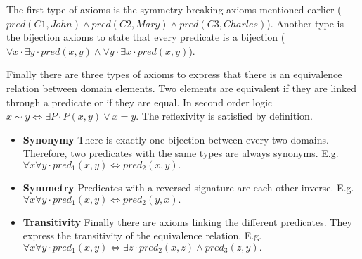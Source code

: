 The first type of axioms is the symmetry-breaking axioms mentioned earlier ($pred(C1, John) \land pred(C2, Mary) \land pred(C3, Charles)$). Another type is the bijection axioms to state that every predicate is a bijection ($\forall x \cdot \exists y \cdot pred(x, y) \land \forall y \cdot \exists x \cdot pred(x, y)$).

Finally there are three types of axioms to express that there is an equivalence relation between domain elements. Two elements are equivalent if they are linked through a predicate or if they are equal. In second order logic $x \sim y \Leftrightarrow \exists P \cdot P(x, y) \lor x = y$. The reflexivity is satisfied by definition.

\begin{itemize}
  \item \textbf{Synonymy} There is exactly one bijection between every two domains. Therefore, two predicates with the same types are always synonyms. E.g. $\forall x \forall y \cdot pred_1(x, y) \Leftrightarrow pred_2(x, y).$
  \item \textbf{Symmetry} Predicates with a reversed signature are each other inverse. E.g. $\forall x \forall y \cdot pred_1(x, y) \Leftrightarrow pred_2(y, x).$
  \item \textbf{Transitivity} Finally there are axioms linking the different predicates. They express the transitivity of the equivalence relation. E.g. $\forall x \forall y \cdot pred_1(x, y) \Leftrightarrow \exists z \cdot pred_2(x, z) \land pred_3(z, y).$
\end{itemize}


